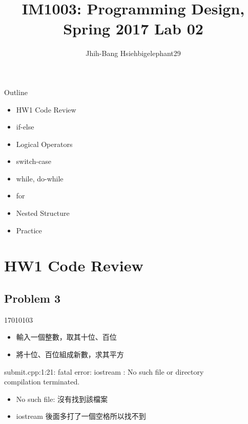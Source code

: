 \documentclass[t]{beamer}
\title{IM1003: Programming Design, Spring 2017  \linebreak Lab 02}
\author[bigelephant29]{Jhih-Bang Hsieh\linebreak \small{bigelephant29}}
\institute{\textbf{National Taiwan University}}
\date{}
\begin{document}
\begin{frame}
  \maketitle
\end{frame}

\begin{frame}{Outline}
  \begin{itemize}
    \item HW1 Code Review
    \item if-else
    \item Logical Operators
    \item switch-case
    \item while, do-while
    \item for
    \item Nested Structure
    \item Practice
  \end{itemize}
\end{frame}

\section{HW1 Code Review}
\subsection{Problem 3}
\begin{frame}{17010103}
  \begin{itemize}
    \item 輸入一個整數，取其十位、百位
    \item 將十位、百位組成新數，求其平方
  \end{itemize}
\end{frame}

\begin{frame}
   
  submit.cpp:1:21: fatal error: iostream : No such file or directory\\
  compilation terminated.
  \vspace{2em}
  \begin{itemize}
    \item No such file: 沒有找到該檔案
    \item iostream 後面多打了一個空格所以找不到
  \end{itemize}
\end{frame}
\end{document}
